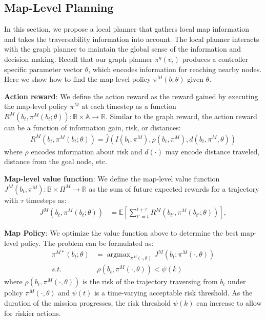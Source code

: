 \documentclass{article}
\newcommand{\ph}[1]{{\textbf{#1}:}} %
\newcommand{\argmax}{\mathop{\mathrm{argmax}}}
\begin{document}
\subsection{Map-Level Planning}
In this section, we propose a local planner that gathers local map information and takes the traversability information into account. The local planner interacts with the graph planner to maintain the global sense of the information and decision making.  Recall that our graph planner $\pi^g(v_i)$ produces a controller specific parameter vector $\theta$, which encodes information for reaching nearby nodes.  Here we show how to find the map-level policy $\pi^M(b;\theta)$ given $\theta$.

\ph{Action reward}
We define the action reward as the reward gained by executing the map-level policy $\pi^M$ at each timestep as a function $R^M(b_t, \pi^M(b_t;\theta)): \mathbb{B} \times \mathbb{A} \to \mathbb{R}$.  
Similar to the graph reward, the action reward can be a function of information gain, risk, or distances:
\begin{align}
    R^M(b_t, \pi^M(b_t;\theta)) = \hat{f}(I(b_t,\pi^M),\rho(b_t,\pi^M),d(b_t,\pi^M,\theta))
\end{align}
where $\rho$ encodes information about risk and $d(\cdot)$ may encode distance traveled, distance from the goal node, etc.

\ph{Map-level value function}
We define the map-level value function $J^M(b_t, \pi^M): \mathbb{B} \times \Pi^M \to \mathbb{R}$ as the sum of future expected rewards for a trajectory with $\tau$ timesteps as:
\begin{align}
  J^M(b_t,\pi^M(b_t;\theta)) &= \mathbb{E} \left[ \sum_{t'=t}^{t+\tau} R^M(b_{t'},\pi^M(b_{t'};\theta))\right], \label{eq:localplan_cost}
\end{align}

\ph{Map Policy}
We optimize the value function above to determine the best map-level policy.  The problem can be formulated as:
\begin{align}
  \pi^{M*}(b_t;\theta) &= \argmax_{\pi^M(\cdot,\theta)} J^M(b_t;\pi^M(\cdot,\theta))
  \nonumber \\
  s.t.~&~\rho(b_t,\pi^M(\cdot,\theta)) < \psi(k)
  \label{eq:mapopt}
\end{align}
where $\rho(b_t,\pi^M(\cdot,\theta))$ is the risk of the trajectory traversing from $b_t$ under policy $\pi^M(\cdot,\theta)$ and $\psi(t)$ is a time-varying acceptable risk threshold.  As the duration of the mission progresses, the risk threshold $\psi(k)$ can increase to allow for riskier actions.
\end{document}
